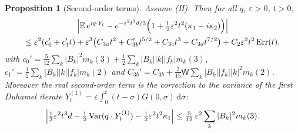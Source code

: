 \documentclass[11pt]{article}
\newcommand{\dd}{\mathrm{d}}
\newcommand{\E}{\mathbb{E}}
\newcommand{\eps}{\varepsilon}
\newcommand{\sW}{\mathsf{W}}
\newtheorem{proposition}[theorem]{Proposition}
\theoremstyle{remark}
\begin{document}
\begin{proposition}[Second-order terms]\label{prop:second}
Assume \textup{(H)}. Then for all $q$, $\eps>0$, $t>0$,
\begin{multline}
  \Bigl|\E\,e^{iq\cdot Y_t}-e^{-\eps^2t^3d/3}
     \Bigl(1+\tfrac12\eps^2t^2(\kappa_1-i\kappa_2)\Bigr)\Bigr| \\
  \le\eps^2(c_0'+c_1't)
   +\eps^3\bigl(C_{3a}t^2+C_{3b}'t^{5/2}+C_{3c}t^3+C_{3d}t^{7/2}\bigr)
   +C_2\eps^2t^2\,\mathrm{Err}(t),
  \label{eq:second}
\end{multline}
with $c_0' = \frac5{12}\sum_k|B_k|^2m_k(3)+\frac12\sum_k|B_k||k||f_k|m_k(3)$,
$c_1' = \frac12\sum_k|B_k||k||f_k|m_k(2)$ and
$C_{3b}' = C_{3b}+\frac2{15}\sW\sum_k|B_k||f_k||k|^2m_k(2)$. Moreover the real
second-order term is the correction to the variance of the first Duhamel
iterate $Y^{(1)}_t = \eps\int_0^t(t-\sigma)G(0,\sigma)\,\dd\sigma$:
\begin{equation}
  \Bigl|\tfrac13\eps^2t^3d-\tfrac12\operatorname{Var}(q\cdot Y^{(1)}_t)
   -\tfrac12\eps^2t^2\kappa_1\Bigr|\le\tfrac5{12}\,\eps^2\sum_k|B_k|^2m_k(3).
  \label{eq:var1}
\end{equation}
\end{proposition}
\end{document}
